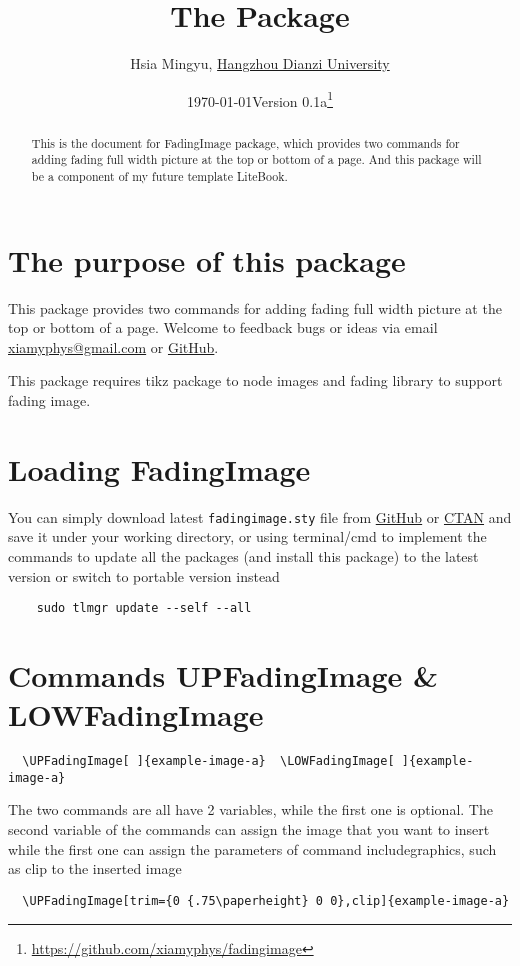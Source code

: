 \documentclass[11pt]{article}
\title{\bfseries The \pkg{FadingImage} Package}
\author{Hsia Mingyu, \href{https://www.hdu.edu.cn}{Hangzhou Dianzi University}}
\affil{\href{mailto:xiamyphys@gmail.com}{\ttfamily xiamyphys@gmail.com}}
\date{\today\quad Version 0.1a\thanks{\url{https://github.com/xiamyphys/fadingimage}}}
\def\pkg#1{\texorpdfstring{\textcolor{pkgcolor}{\textsf{#1}}}{“#1”}}
\def\cmd#1{\texorpdfstring{\textcolor{cmdcolor}{\textsf{#1}}}{“#1”}}
\begin{document}
\maketitle
{}

\vspace{-6ex}
\begin{abstract}
This is the document for \pkg{FadingImage} package, which provides two commands for adding fading full width picture at the top or bottom of a page. And this package will be a component of my future template \pkg{LiteBook}.
\end{abstract}

\section{The purpose of this package}
This package provides two commands for adding fading full width picture at the top or bottom of a page. Welcome to feedback bugs or ideas via email \href{mailto:xiamyphys@gmail.com}{\ttfamily xiamyphys@gmail.com} or \href{https://github.com/xiamyphys/fadingimage}{GitHub}.

This package requires \pkg{tikz} package to node images and \pkg{fading} library to support fading image.

\section{Loading \pkg{FadingImage}}
You can simply download latest \verb|fadingimage.sty| file from \href{https://github.com/xiamyphys/FadingImage}{GitHub} or \href{https://ctan.org/pkg/fadingimage}{CTAN} and save it under your working directory, or using terminal/cmd to implement the commands to update all the packages (and install this package) to the latest version or switch to portable version instead
\begin{verbatim}
    sudo tlmgr update --self --all
\end{verbatim}

\section{Commands \cmd{UPFadingImage} \& \cmd{LOWFadingImage}}
\begin{verbatim}
  \UPFadingImage[ ]{example-image-a}  \LOWFadingImage[ ]{example-image-a}
\end{verbatim}

The two commands are all have 2 variables, while the first one is optional. The second variable of the commands can assign the image that you want to insert while the first one can assign the parameters of command \cmd{includegraphics}, such as clip to the inserted image
\begin{verbatim}
  \UPFadingImage[trim={0 {.75\paperheight} 0 0},clip]{example-image-a}
\end{verbatim}
\end{document}

